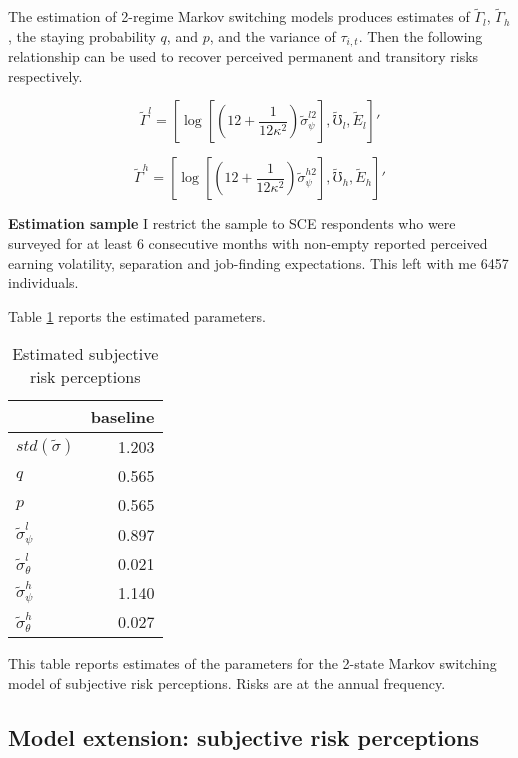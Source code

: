 The estimation of 2-regime Markov switching models produces estimates of $\tilde \Gamma_l$, $\tilde \Gamma_h$, the staying probability $q$, and $p$, and the variance of $\tau_{i,t}$. Then the following relationship can be used to recover perceived permanent and transitory risks respectively. 

$$\tilde \Gamma^l=[\log[(12+\frac{1}{12\kappa^2})\tilde \sigma^{l2}_{\psi}],\tilde \mho_l,\tilde E_l]'$$

$$\tilde \Gamma^h = [\log[(12+\frac{1}{12\kappa^2})\tilde \sigma^{h2}_{\psi}],\tilde \mho_h,\tilde E_h]'$$

\textbf{Estimation sample} I restrict the sample to SCE respondents who were surveyed for at least 6 consecutive months with non-empty reported perceived earning volatility, separation and job-finding expectations. This left with me 6457 individuals.

Table \ref{tab:PRMarkovEst} reports the estimated parameters. 

\begin{table}[p]
\centering
\begin{threeparttable}
\caption{Estimated subjective risk perceptions}
\label{tab:PRMarkovEst}
\begin{tabular}{lr}
\toprule
{} &  baseline \\
\midrule

$std(\tilde\sigma)$&     1.203 \\
$q$                     &     0.565 \\
$p$                     &     0.565 \\
$\tilde \sigma^l_\psi$   &     0.897 \\
$\tilde \sigma^l_\theta$ &     0.021 \\
$\tilde \sigma^h_\psi$   &     1.140 \\
$\tilde \sigma^h_\theta$  &     0.027 \\
\bottomrule
\end{tabular}
	\begin{flushleft}
		{\footnotesize This table reports estimates of the parameters for the 2-state Markov switching model of subjective risk perceptions. Risks are at the annual frequency. }
			\end{flushleft}
\end{threeparttable}
\end{table}


\subsection{Model extension: subjective risk perceptions}
\label{appendix:subjective_model}

